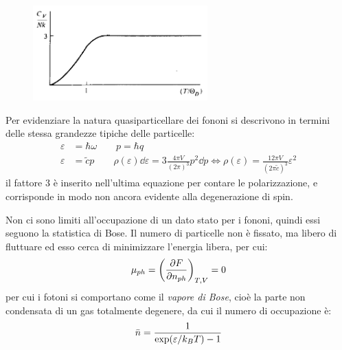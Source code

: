 \begin{figure}[h]
	\centering
	\includegraphics[width=0.6\textwidth]{Immagini/HeatCapacityDebye.png}
	\vspace{-10pt}
	\caption{}
	\label{fig:heatcapdeb}
\end{figure}

Per evidenziare la natura quasiparticellare dei fononi si descrivono in termini delle stessa grandezze tipiche delle particelle:
\begin{align*}
	\varepsilon &= \hbar \omega \qquad p = \hbar q\\
	\varepsilon &= \tilde{c} p \qquad \rho(\varepsilon) \dd \varepsilon =  3 \frac{4\pi V}{(2\pi)^3} p^2 \dd p \iff 
	\rho(\varepsilon)= \frac{12\pi V}{(2\pi\tilde{c})^3}\varepsilon^2 
\end{align*}
il fattore $ 3 $ è inserito nell'ultima equazione per contare le polarizzazione, e corrisponde in modo non ancora evidente alla degenerazione di spin.

Non ci sono limiti all'occupazione di un dato stato per i fononi, quindi essi seguono la statistica di Bose. Il numero di particelle non è fissato, ma libero di fluttuare ed esso cerca di minimizzare l'energia libera, per cui:
\begin{equation*}
\mu_{ph} = \left(\frac{\partial {F}}{\partial {n_{ph}}}\right)_{T,V} = 0
\end{equation*}
per cui i fotoni si comportano come il \textit{vapore di Bose}, cioè la parte non condensata di un gas totalmente degenere, da cui il numero di occupazione è:
\begin{equation*}
\bar{n} = \frac{1}{\exp(\varepsilon/k_B T) - 1}
\end{equation*}

